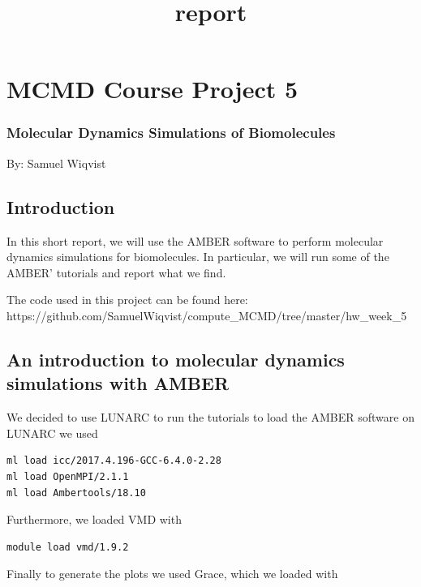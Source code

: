 \documentclass[11pt]{article}
\title{report}
\begin{document}
    
    
    \maketitle
    
    

    
    \section{MCMD Course Project 5}\label{mcmd-course-project-5}

\subsubsection{Molecular Dynamics Simulations of
Biomolecules}\label{molecular-dynamics-simulations-of-biomolecules}

By: Samuel Wiqvist

    \subsection{Introduction}\label{introduction}

In this short report, we will use the AMBER software to perform
molecular dynamics simulations for biomolecules. In particular, we will
run some of the AMBER' tutorials and report what we find.

The code used in this project can be found here:
https://github.com/SamuelWiqvist/compute\_MCMD/tree/master/hw\_week\_5

    \subsection{An introduction to molecular dynamics simulations with
AMBER}\label{an-introduction-to-molecular-dynamics-simulations-with-amber}

We decided to use LUNARC to run the tutorials to load the AMBER software
on LUNARC we used

\begin{verbatim}
ml load icc/2017.4.196-GCC-6.4.0-2.28
ml load OpenMPI/2.1.1
ml load Ambertools/18.10
\end{verbatim}

Furthermore, we loaded VMD with

\begin{verbatim}
module load vmd/1.9.2
\end{verbatim}

Finally to generate the plots we used Grace, which we loaded with
\end{document}
